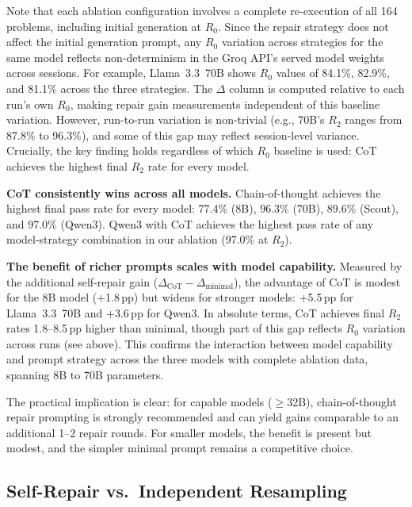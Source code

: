 \documentclass[conference]{IEEEtran}
\begin{document}
Note that each ablation configuration involves a complete re-execution of all 164 problems, including initial generation at $R_0$. Since the repair strategy does not affect the initial generation prompt, any $R_0$ variation across strategies for the same model reflects non-determinism in the Groq API's served model weights across sessions. For example, Llama~3.3~70B shows $R_0$ values of 84.1\%, 82.9\%, and 81.1\% across the three strategies. The $\Delta$ column is computed relative to each run's own $R_0$, making repair gain measurements independent of this baseline variation. However, run-to-run variation is non-trivial (e.g., 70B's $R_2$ ranges from 87.8\% to 96.3\%), and some of this gap may reflect session-level variance. Crucially, the key finding holds regardless of which $R_0$ baseline is used: CoT achieves the highest final $R_2$ rate for every model.

\textbf{CoT consistently wins across all models.} Chain-of-thought achieves the highest final pass rate for every model: 77.4\% (8B), 96.3\% (70B), 89.6\% (Scout), and 97.0\% (Qwen3). Qwen3 with CoT achieves the highest pass rate of any model-strategy combination in our ablation (97.0\% at $R_2$).

\textbf{The benefit of richer prompts scales with model capability.} Measured by the additional self-repair gain ($\Delta_\text{CoT} - \Delta_\text{minimal}$), the advantage of CoT is modest for the 8B model (+1.8\,pp) but widens for stronger models: +5.5\,pp for Llama~3.3~70B and +3.6\,pp for Qwen3. In absolute terms, CoT achieves final $R_2$ rates 1.8--8.5\,pp higher than minimal, though part of this gap reflects $R_0$ variation across runs (see above). This confirms the interaction between model capability and prompt strategy across the three models with complete ablation data, spanning 8B to 70B parameters.

The practical implication is clear: for capable models ($\geq$32B), chain-of-thought repair prompting is strongly recommended and can yield gains comparable to an additional 1--2 repair rounds. For smaller models, the benefit is present but modest, and the simpler minimal prompt remains a competitive choice.

\subsection{Self-Repair vs.\ Independent Resampling}
\end{document}
